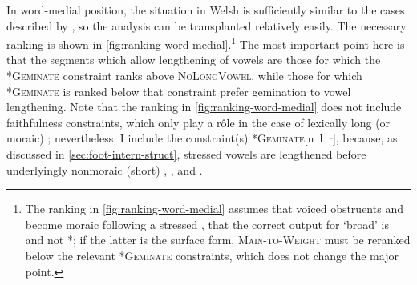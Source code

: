 In word\hyp medial position, the situation in Welsh is sufficiently similar to the cases described by \citet{bye08}, so the analysis can be transplanted relatively easily. The necessary ranking is shown in \cref{fig:ranking-word-medial}.\footnote{The ranking in \cref{fig:ranking-word-medial} assumes that voiced obstruents and \ipa{[f~θ~χ]} become moraic following a stressed \ipa{[ə]}, \ie that the correct output for  `broad' is  and not *; if the latter is the surface form, \textsc{Main\hyp to\hyp Weight} must be reranked below the relevant \textsc{*Geminate} constraints, which does not change the major point.} The most important point here is that the segments which allow lengthening of vowels are those for which the \textsc{*Geminate} constraint ranks above \textsc{NoLongVowel}, while those for which \textsc{*Geminate} is ranked below that constraint prefer gemination to vowel lengthening. Note that the ranking in \cref{fig:ranking-word-medial} does not include faithfulness constraints, which only play a rôle in the case of lexically long (or moraic) \ipa{[n~l~r]}; nevertheless, I include the constraint(s) \textsc{*Geminate}[n~l~r], because, as discussed in \cref{sec:foot-intern-struct}, stressed vowels are lengthened before underlyingly nonmoraic (short) \ipa{[n]}, \ipa{[l]}, and \ipa{[r]}.

